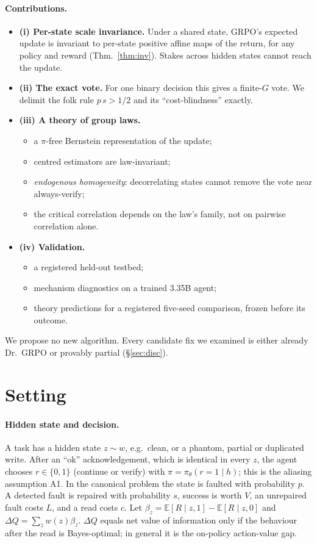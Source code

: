 \documentclass[11pt]{article}
\begin{document}
\paragraph{Contributions.}
\begin{itemize}
\item \textbf{(i) Per-state scale invariance.} Under a shared state, GRPO's expected update is invariant to per-state
positive affine maps of the return, for any policy and reward (Thm.~\ref{thm:inv}). Stakes across hidden states
cannot reach the update.
\item \textbf{(ii) The exact vote.} For one binary decision this gives a finite-$G$ vote. We delimit the folk rule
$p\,s>1/2$ and its ``cost-blindness'' exactly.
\item \textbf{(iii) A theory of group laws.}
\begin{itemize}
\item a $\pi$-free Bernstein representation of the update;
\item centred estimators are law-invariant;
\item \emph{endogenous homogeneity}: decorrelating states cannot remove the vote near always-verify;
\item the critical correlation depends on the law's family, not on pairwise correlation alone.
\end{itemize}
\item \textbf{(iv) Validation.}
\begin{itemize}
\item a registered held-out testbed;
\item mechanism diagnostics on a trained 3.35B agent;
\item theory predictions for a registered five-seed comparison, frozen before its outcome.
\end{itemize}
\end{itemize}
We propose no new algorithm. Every candidate fix we examined is either already Dr.~GRPO or provably partial
(\S\ref{sec:disc}).

\section{Setting}\label{sec:setup}
\paragraph{Hidden state and decision.} A task has a hidden state $z\sim w$, e.g.\ clean, or a phantom, partial or
duplicated write. After an ``ok'' acknowledgement, which is identical in every $z$, the agent chooses $r\in\{0,1\}$
(continue or verify) with $\pi=\pi_\theta(r{=}1\mid h)$; this is the aliasing assumption A1. In the canonical
problem the state is faulted with probability $p$. A detected fault is repaired with probability $s$, success is
worth $V$, an unrepaired fault costs $L$, and a read costs $c$. Let $\beta_z=\mathbb E[R\mid z,1]-\mathbb E[R\mid z,0]$
and $\Delta Q=\sum_zw(z)\beta_z$. $\Delta Q$ equals net value of information only if the behaviour after the read is
Bayes-optimal; in general it is the on-policy action-value gap.
\end{document}
